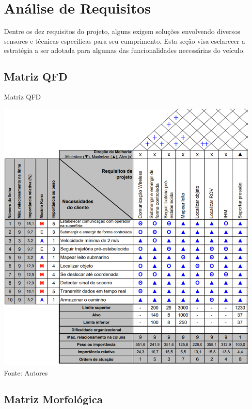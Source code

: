\section{Análise de Requisitos}
\label{sec:analise-de-requisitos}

Dentre os dez requisitos do projeto, alguns exigem soluções envolvendo diversos sensores e técnicas específicas para seu cumprimento. Esta seção visa esclarecer a estratégia a ser adotada para algumas das funcionalidades necessárias do veículo.


\subsection{Matriz QFD}
\label{subsec:matriz-qfd}

\begin{table}[h]
	\centering
	\caption{Matriz QFD}
	\label{tab:qfd-brov}
	\includegraphics[width=1\linewidth]{images/QFD-BROV.png}\\
	\footnotesize Fonte: Autores
\end{table}

\subsection{Matriz Morfológica}
\label{subsec:matriz-morfologica}

